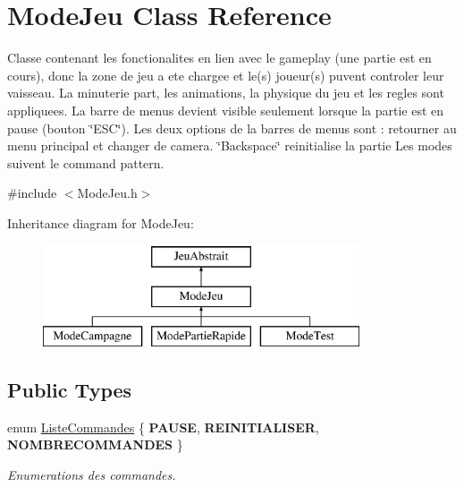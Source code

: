 \hypertarget{class_mode_jeu}{\section{Mode\-Jeu Class Reference}
\label{class_mode_jeu}
}


Classe contenant les fonctionalites en lien avec le gameplay (une partie est en cours), donc la zone de jeu a ete chargee et le(s) joueur(s) puvent controler leur vaisseau. La minuterie part, les animations, la physique du jeu et les regles sont appliquees. La barre de menus devient visible seulement lorsque la partie est en pause (bouton \char`\"{}\-E\-S\-C\char`\"{}). Les deux options de la barres de menus sont \-: retourner au menu principal et changer de camera. \char`\"{}\-Backspace\char`\"{} reinitialise la partie Les modes suivent le command pattern.  




{\ttfamily \#include $<$Mode\-Jeu.\-h$>$}

Inheritance diagram for Mode\-Jeu\-:\begin{figure}[H]
\begin{center}
\leavevmode
\includegraphics[height=3.000000cm]{class_mode_jeu}
\end{center}
\end{figure}
\subsection*{Public Types}
\begin{DoxyCompactItemize}
\item 
enum \hyperlink{group__inf2990_ga71285f3153fb23eef836554fd235cddf}{Liste\-Commandes} \{ {\bfseries P\-A\-U\-S\-E}, 
{\bfseries R\-E\-I\-N\-I\-T\-I\-A\-L\-I\-S\-E\-R}, 
{\bfseries N\-O\-M\-B\-R\-E\-C\-O\-M\-M\-A\-N\-D\-E\-S}
 \}
\begin{DoxyCompactList}\small\item\em Enumerations des commandes. \end{DoxyCompactList}\end{DoxyCompactItemize}
